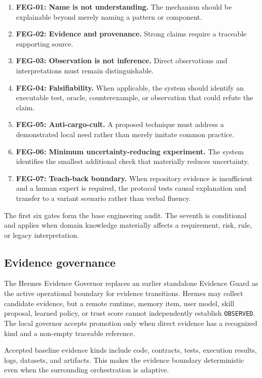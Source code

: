 \begin{enumerate}
  \item \textbf{FEG-01: Name is not understanding.} The mechanism should be explainable beyond merely naming a pattern or component.
  \item \textbf{FEG-02: Evidence and provenance.} Strong claims require a traceable supporting source.
  \item \textbf{FEG-03: Observation is not inference.} Direct observations and interpretations must remain distinguishable.
  \item \textbf{FEG-04: Falsifiability.} When applicable, the system should identify an executable test, oracle, counterexample, or observation that could refute the claim.
  \item \textbf{FEG-05: Anti-cargo-cult.} A proposed technique must address a demonstrated local need rather than merely imitate common practice.
  \item \textbf{FEG-06: Minimum uncertainty-reducing experiment.} The system identifies the smallest additional check that materially reduces uncertainty.
  \item \textbf{FEG-07: Teach-back boundary.} When repository evidence is insufficient and a human expert is required, the protocol tests causal explanation and transfer to a variant scenario rather than verbal fluency.
\end{enumerate}

The first six gates form the base engineering audit. The seventh is conditional and applies when domain knowledge materially affects a requirement, risk, rule, or legacy interpretation.

\subsection{Evidence governance}

The Hermes Evidence Governor replaces an earlier standalone Evidence Guard as the active operational boundary for evidence transitions. Hermes may collect candidate evidence, but a remote runtime, memory item, user model, skill proposal, learned policy, or trust score cannot independently establish \texttt{OBSERVED}. The local governor accepts promotion only when direct evidence has a recognized kind and a non-empty traceable reference.

Accepted baseline evidence kinds include code, contracts, tests, execution results, logs, datasets, and artifacts. This makes the evidence boundary deterministic even when the surrounding orchestration is adaptive.


